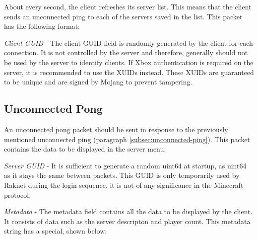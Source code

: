 About every second, the client refreshes its server list.
This means that the client sends an unconnected ping to each of the servers saved in the list.
This packet has the following format:


\textit{Client GUID} - The client GUID field is randomly generated by the client for each connection.
It is not controlled by the server and therefore, generally should not be used by the server to identify clients.
If Xbox authentication is required on the server, it is recommended to use the XUIDs instead.
These XUIDs are guaranteed to be unique and are signed by Mojang to prevent tampering.

\subsection{Unconnected Pong}\label{subsec:unconnected-pong}

An unconnected pong packet should be sent in response to the previously mentioned unconnected ping (paragraph \ref{subsec:unconnected-ping}).
This packet contains the data to be displayed in the server menu.


\textit{Server GUID} - It is sufficient to generate a random uint64 at startup, as uint64 as it stays the same between packets.
This GUID is only temporarily used by Raknet during the login sequence, it is not of any significance in the Minecraft protocol.

\textit{Metadata} - The metadata field contains all the data to be displayed by the client.
It consists of data such as the server descripton and player count.
This metadata string has a special, shown below:

